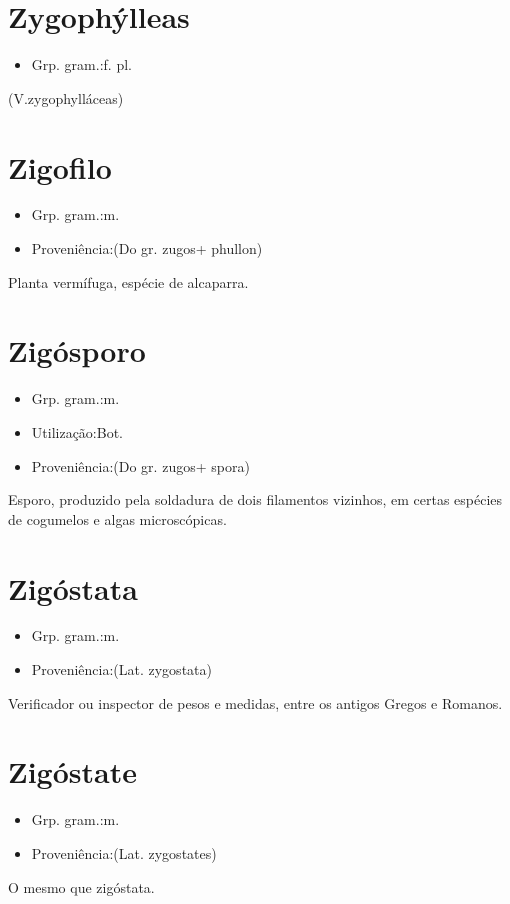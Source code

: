 \section{Zygophýlleas}
\begin{itemize}
\item {Grp. gram.:f. pl.}
\end{itemize}
(V.zygophylláceas)
\section{Zigofilo}
\begin{itemize}
\item {Grp. gram.:m.}
\end{itemize}
\begin{itemize}
\item {Proveniência:(Do gr. \textunderscore zugos\textunderscore  + \textunderscore phullon\textunderscore )}
\end{itemize}
Planta vermífuga, espécie de alcaparra.
\section{Zigósporo}
\begin{itemize}
\item {Grp. gram.:m.}
\end{itemize}
\begin{itemize}
\item {Utilização:Bot.}
\end{itemize}
\begin{itemize}
\item {Proveniência:(Do gr. \textunderscore zugos\textunderscore  + \textunderscore spora\textunderscore )}
\end{itemize}
Esporo, produzido pela soldadura de dois filamentos vizinhos, em certas espécies de cogumelos e algas microscópicas.
\section{Zigóstata}
\begin{itemize}
\item {Grp. gram.:m.}
\end{itemize}
\begin{itemize}
\item {Proveniência:(Lat. \textunderscore zygostata\textunderscore )}
\end{itemize}
Verificador ou inspector de pesos e medidas, entre os antigos Gregos e Romanos.
\section{Zigóstate}
\begin{itemize}
\item {Grp. gram.:m.}
\end{itemize}
\begin{itemize}
\item {Proveniência:(Lat. \textunderscore zygostates\textunderscore )}
\end{itemize}
O mesmo que \textunderscore zigóstata\textunderscore .
